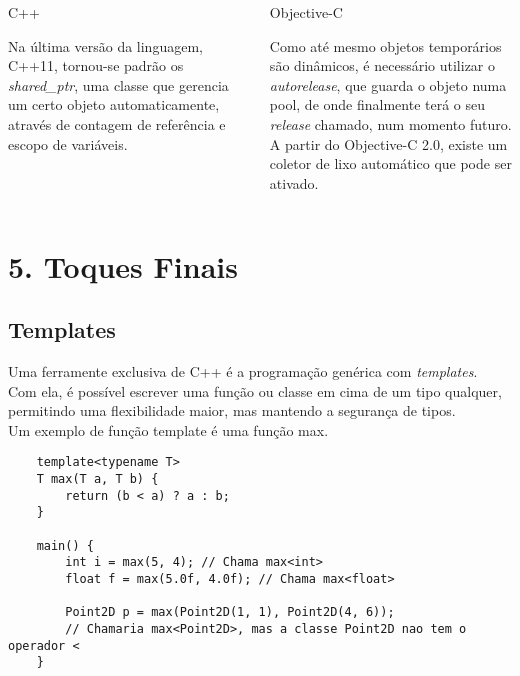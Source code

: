 \documentclass[brazil]{beamer}
\begin{document}
\begin{frame}
  \begin{columns}
    \begin{column}{.5\textwidth}
        \begin{center}
            C++
        \end{center}
        Na última versão da linguagem, C++11, tornou-se padrão os \textit{shared\_ptr},
        uma classe que gerencia um certo objeto automaticamente, através de contagem de referência
        e escopo de variáveis.
    \end{column}
    \begin{column}{.5\textwidth}
        \begin{center}
            Objective-C
        \end{center}
        Como até mesmo objetos temporários são dinâmicos, é necessário utilizar o \textit{autorelease},
        que guarda o objeto numa pool, de onde finalmente terá o seu \textit{release} chamado, num momento futuro. \\
        A partir do Objective-C 2.0, existe um coletor de lixo automático que pode ser ativado.
    \end{column}
  \end{columns}
\end{frame}

\section{5. Toques Finais}

\subsection{Templates}
\begin{frame}[fragile]
  Uma ferramente exclusiva de C++ é a programação genérica com \textit{templates}. \\
  Com ela, é possível escrever uma função ou classe em cima de um tipo qualquer, permitindo uma flexibilidade maior, mas mantendo a segurança de tipos. \\
  Um exemplo de função template é uma função max.

  \lstset{language=C++,basicstyle=\tiny}
  \begin{lstlisting}
    template<typename T>
    T max(T a, T b) {
        return (b < a) ? a : b;
    }
    
    main() {
        int i = max(5, 4); // Chama max<int>
        float f = max(5.0f, 4.0f); // Chama max<float>
        
        Point2D p = max(Point2D(1, 1), Point2D(4, 6));
        // Chamaria max<Point2D>, mas a classe Point2D nao tem o operador <
    }
  \end{lstlisting}
\end{frame}
\end{document}
